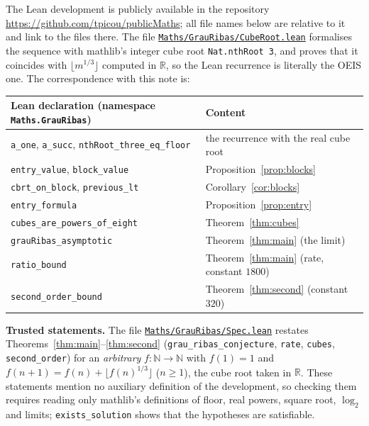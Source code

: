 \documentclass[11pt]{amsart}
\theoremstyle{remark}
\newcommand{\lean}[1]{\texttt{#1}}
\begin{document}
The Lean development is publicly available in the repository \url{https://github.com/tpicou/publicMaths}; all file
names below are relative to it and link to the files there. The file
\href{https://github.com/tpicou/publicMaths/blob/main/Maths/GrauRibas/CubeRoot.lean}{\texttt{Maths/GrauRibas/CubeRoot.lean}} formalises the sequence with
mathlib's integer cube root \lean{Nat.nthRoot 3}, and proves that it coincides with
$\lfloor m^{1/3}\rfloor$ computed in $\mathbb R$, so the Lean recurrence is literally the OEIS one.
The correspondence with this note is:

\medskip
\begin{center}
\begin{tabular}{ll}
\toprule
Lean declaration (namespace \lean{Maths.GrauRibas}) & Content\\
\midrule
\lean{a\_one}, \lean{a\_succ}, \lean{nthRoot\_three\_eq\_floor} & the recurrence with the real cube root\\
\lean{entry\_value}, \lean{block\_value} & Proposition~\ref{prop:blocks}\\
\lean{cbrt\_on\_block}, \lean{previous\_lt} & Corollary~\ref{cor:blocks}\\
\lean{entry\_formula} & Proposition~\ref{prop:entry}\\
\lean{cubes\_are\_powers\_of\_eight} & Theorem~\ref{thm:cubes}\\
\lean{grauRibas\_asymptotic} & Theorem~\ref{thm:main} (the limit)\\
\lean{ratio\_bound} & Theorem~\ref{thm:main} (rate, constant $1800$)\\
\lean{second\_order\_bound} & Theorem~\ref{thm:second} (constant $320$)\\
\bottomrule
\end{tabular}
\end{center}
\medskip

\smallskip
{\sloppy
\noindent\textbf{Trusted statements.} The file \href{https://github.com/tpicou/publicMaths/blob/main/Maths/GrauRibas/Spec.lean}{\texttt{Maths/GrauRibas/Spec.lean}} restates
Theorems~\ref{thm:main}--\ref{thm:second} (\lean{grau\_ribas\_conjecture}, \lean{rate},
\lean{cubes}, \lean{second\_order}) for an \emph{arbitrary} $f:\mathbb N\to\mathbb N$ with $f(1)=1$
and $f(n+1)=f(n)+\lfloor f(n)^{1/3}\rfloor$ ($n\ge1$), the cube root taken in $\mathbb R$. These
statements mention no auxiliary definition of the development, so checking them requires reading
only mathlib's definitions of floor, real powers, square root, $\log_2$ and limits;
\lean{exists\_solution} shows that the hypotheses are satisfiable.\par}
\end{document}
